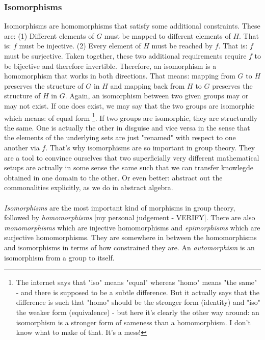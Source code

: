 \subsubsection{Isomorphisms}
Isomorphisms are homomorphisms that satisfy some additional constraints. These are: (1) Different elements of $G$ must be mapped to different elements of $H$. That is: $f$ must be injective. (2) Every element of $H$ must be reached by $f$. That is: $f$ must be surjective. Taken together, these two additional requirements require $f$ to be bijective and therefore invertible. Therefore, an isomorphism is a homomorphism that works in both directions. That means: mapping from $G$ to $H$ preserves the structure of $G$ in $H$ and mapping back from $H$ to $G$ preserves the structure of $H$ in $G$. Again, an isomorphism between two given groups may or may not exist. If one does exist, we may say that the two groups are isomorphic which means: of equal form \footnote{The internet says that "iso" means "equal" whereas "homo" means "the same" - and there is supposed to be a subtle difference. But it actually says that the difference is such that "homo" should be the stronger form (identity) and "iso" the weaker form (equivalence) - but here it's clearly the other way around: an isomorphism is a stronger form of sameness than a homomorphism. I don't know what to make of that. It's a mess!}. If two groups are isomorphic, they are structurally the same. One is actually the other in disguise and vice versa in the sense that the elements of the underlying sets are just "renamed" with respect to one another via $f$. 
That's why isomorphisms are so important in group theory. They are a tool to convince ourselves that two superficially very different mathematical setups are actually in some sense the same such that we can transfer knowlegde obtained in one domain to the other. Or even better: abstract out the commonalities explicitly, as we do in abstract algebra.

\paragraph{}
\emph{Isomorphisms} are the most important kind of morphisms in group theory, followed by \emph{homomorphisms} [my personal judgement - VERIFY]. There are also \emph{monomorphisms} which are injective homomorphisms and \emph{epimorphisms} which are surjective homomorphisms. They are somewhere in between the homomorphisms and isomorphisms in terms of how constrained they are. An \emph{automorphism} is an isomorphism from a group to itself.

